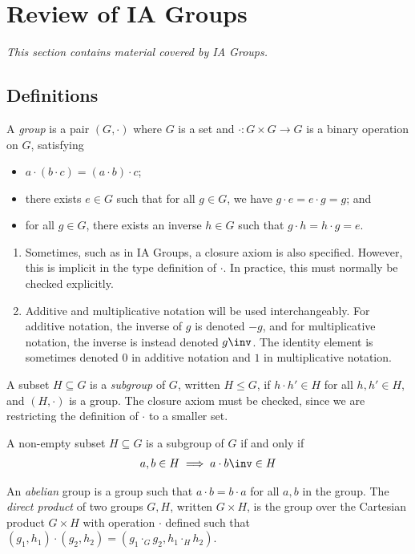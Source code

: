 \section{Review of IA Groups}

\textit{This section contains material covered by IA Groups.}

\subsection{Definitions}
A \textit{group} is a pair $(G, \cdot)$ where $G$ is a set and $\cdot \colon G \times G \to G$ is a binary operation on $G$, satisfying
\begin{itemize}
	\item $a \cdot (b \cdot c) = (a \cdot b) \cdot c$;
	\item there exists $e \in G$ such that for all $g \in G$, we have $g \cdot e = e \cdot g = g$; and
	\item for all $g \in G$, there exists an inverse $h \in G$ such that $g \cdot h = h \cdot g = e$.
\end{itemize}
\begin{remark}
	\begin{enumerate}
		\item Sometimes, such as in IA Groups, a closure axiom is also specified.
		      However, this is implicit in the type definition of $\cdot$.
		      In practice, this must normally be checked explicitly.
		\item Additive and multiplicative notation will be used interchangeably.
		      For additive notation, the inverse of $g$ is denoted $-g$, and for multiplicative notation, the inverse is instead denoted $g\inv$.
		      The identity element is sometimes denoted $0$ in additive notation and $1$ in multiplicative notation.
	\end{enumerate}
\end{remark}
A subset $H \subseteq G$ is a \textit{subgroup} of $G$, written $H \leq G$, if $h \cdot h' \in H$ for all $h, h' \in H$, and $(H, \cdot)$ is a group.
The closure axiom must be checked, since we are restricting the definition of $\cdot$ to a smaller set.
\begin{remark}
	A non-empty subset $H \subseteq G$ is a subgroup of $G$ if and only if
	\begin{align*}
		a, b \in H \implies a \cdot b\inv \in H
	\end{align*}
\end{remark}
An \textit{abelian} group is a group such that $a \cdot b = b \cdot a$ for all $a, b$ in the group.
The \textit{direct product} of two groups $G, H$, written $G \times H$, is the group over the Cartesian product $G \times H$ with operation $\cdot$ defined such that $(g_1, h_1) \cdot (g_2, h_2) = (g_1 \cdot_G g_2, h_1 \cdot_H h_2)$.

